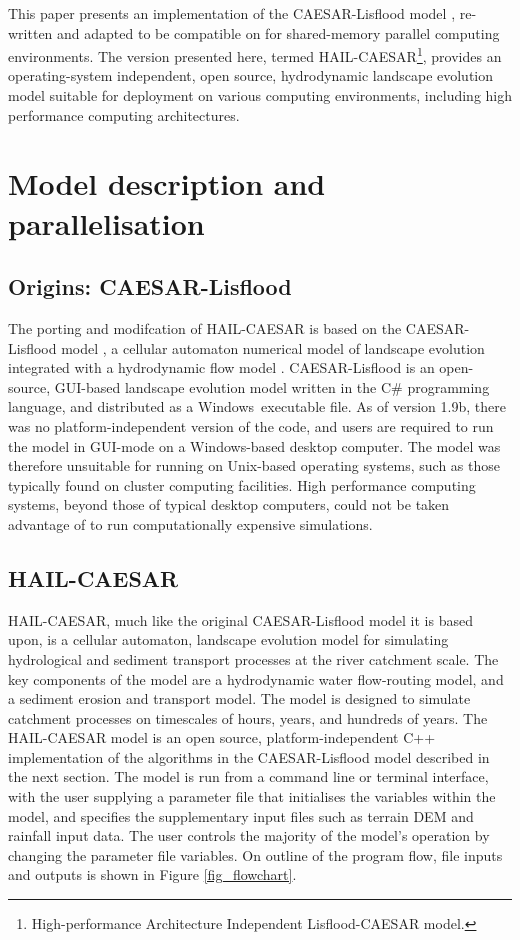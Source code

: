 This paper presents an implementation of the CAESAR-Lisflood model \citep{Coulthard2013}, re-written and adapted to be compatible on for shared-memory parallel computing environments. The version presented here, termed HAIL-CAESAR\footnote{High-performance Architecture Independent Lisflood-CAESAR model.}, provides an operating-system independent, open source, hydrodynamic landscape evolution model suitable for deployment on various computing environments, including high performance computing architectures.


\section{Model description and parallelisation}

\subsection{Origins: CAESAR-Lisflood}
The porting and modifcation of HAIL-CAESAR is based on the CAESAR-Lisflood model \citep{Coulthard2013}, a cellular automaton numerical model of landscape evolution integrated with a hydrodynamic flow model \citep{bates2010simple}. CAESAR-Lisflood is an open-source, GUI-based landscape evolution model written in the C\# programming language, and distributed as a  Windows\texttrademark  \ executable file. As of version 1.9b, there was no platform-independent version of the code, and users are required to run the model in GUI-mode on a Windows-based desktop computer. The model was therefore unsuitable for running on Unix-based operating systems, such as those typically found on cluster computing facilities. High performance computing systems, beyond those of typical desktop computers, could not be taken advantage of to run computationally expensive simulations. 

\subsection{HAIL-CAESAR}

HAIL-CAESAR, much like the original CAESAR-Lisflood model it is based upon, is a cellular automaton, landscape evolution model for simulating hydrological and sediment transport processes at the river catchment scale. The key components of the model are a hydrodynamic water flow-routing model, and a sediment erosion and transport model. The model is designed to simulate catchment processes on timescales of hours, years, and hundreds of years. The HAIL-CAESAR model is an open source, platform-independent C++ implementation of the algorithms in the CAESAR-Lisflood model described in the next section. The model is run from a command line or terminal interface, with the user supplying a parameter file that initialises the variables within the model, and specifies the supplementary input files such as terrain DEM and rainfall input data. The user controls the majority of the model's operation by changing the parameter file variables. On outline of the program flow, file inputs and outputs is shown in Figure \ref{fig_flowchart}.

